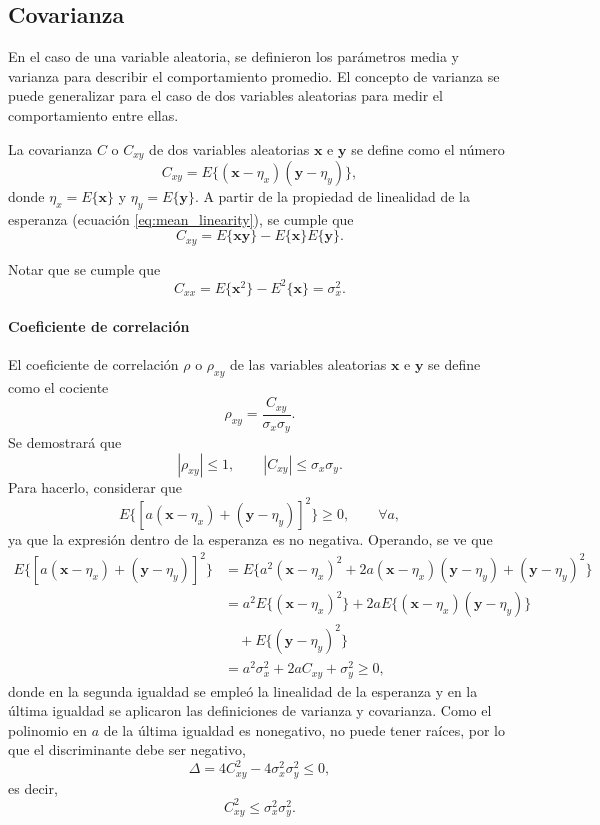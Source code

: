 \documentclass[a4paper]{report}
\newcommand{\x}{\mathbf{x}}
\newcommand{\y}{\mathbf{y}}
\begin{document}
\subsection{Covarianza}

En el caso de una variable aleatoria, se definieron los parámetros media y varianza para describir el comportamiento promedio. El concepto de varianza se puede generalizar para el caso de dos variables aleatorias para medir el comportamiento entre ellas.

La covarianza \(C\) o \(C_{xy}\) de dos variables aleatorias \(\x\) e \(\y\) se define como el número
\begin{equation}\label{eq:covariance_definition}
 C_{xy}=E\{(\x-\eta_x)(\y-\eta_y)\},
\end{equation}
donde \(\eta_x=E\{\x\}\) y \(\eta_y=E\{\y\}\). A partir de la propiedad de linealidad de la esperanza (ecuación \ref{eq:mean_linearity}), se cumple que
\[
 C_{xy}=E\{\x\y\}-E\{\x\}E\{\y\}.
\]

Notar que se cumple que
\[
 C_{xx}=E\{\x^2\}-E^2\{\x\}=\sigma_x^2.
\]

\paragraph{Coeficiente de correlación}

El coeficiente de correlación \(\rho\) o \(\rho_{xy}\) de las variables aleatorias \(\x\) e \(\y\) se define como el cociente
\begin{equation}\label{eq:correlation_coefficient_definition}
 \rho_{xy}=\frac{C_{xy}}{\sigma_x\sigma_y}.
\end{equation}
Se demostrará que
\[
 |\rho_{xy}|\leq1,\qquad |C_{xy}|\leq \sigma_x\sigma_y.
\]
Para hacerlo, considerar que
\[
 E\{[a(\x-\eta_x)+(\y-\eta_y)]^2\}\geq 0,\qquad \forall a,
\]
ya que la expresión dentro de la esperanza es no negativa. Operando, se ve que
\small
\begin{align}\label{eq:covariance_rho_relation_deduction}
 E\{[a(\x-\eta_x)+(\y-\eta_y)]^2\}&=E\{a^2(\x-\eta_x)^2+2a(\x-\eta_x)(\y-\eta_y)+(\y-\eta_y)^2\}\nonumber\\
   &=a^2E\{(\x-\eta_x)^2\}+2aE\{(\x-\eta_x)(\y-\eta_y)\}\nonumber\\
   &\quad+E\{(\y-\eta_y)^2\}\nonumber\\
   &=a^2\sigma_x^2+2aC_{xy}+\sigma_y^2\geq0,
\end{align}
\normalsize
donde en la segunda igualdad se empleó la linealidad de la esperanza y en la última igualdad se aplicaron las definiciones de varianza y covarianza. Como el polinomio en \(a\) de la última igualdad es nonegativo, no puede tener raíces, por lo que el discriminante debe ser negativo,
\[
 \Delta=4C_{xy}^2-4\sigma_x^2\sigma_y^2\leq 0,
\]
es decir,
\[
 C_{xy}^2\leq \sigma_x^2\sigma_y^2.
\]
\end{document}
